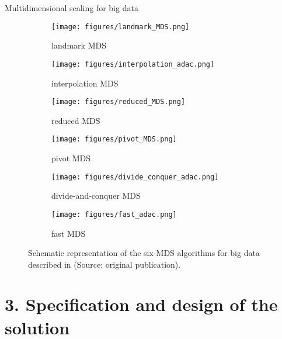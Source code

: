 \documentclass[10pt]{beamer}
\begin{document}
\begin{frame}{Multidimensional scaling for big data}
    \begin{figure}
    \centering
    \captionsetup[subfigure]{labelformat=empty}

    \begin{subfigure}[t]{0.3\textwidth}
        \centering
        \texttt{[image: figures/landmark\_MDS.png]}
        \caption{landmark MDS}
        \label{fig:landmark_MDS}
    \end{subfigure}
    \hfill
    \begin{subfigure}[t]{0.3\textwidth}
        \centering
        \texttt{[image: figures/interpolation\_adac.png]}
        \caption{interpolation MDS}
        \label{fig:interpolation_MDS}
    \end{subfigure}
    \hfill
    \begin{subfigure}[t]{0.3\textwidth}
        \centering
        \texttt{[image: figures/reduced\_MDS.png]}
        \caption{reduced MDS}
        \label{fig:reduced_MDS}
    \end{subfigure}

    \begin{subfigure}[t]{0.3\textwidth}
        \centering
        \texttt{[image: figures/pivot\_MDS.png]}
        \caption{pivot MDS}
        \label{fig:pivot_MDS}
    \end{subfigure}
    \hfill
    \begin{subfigure}[t]{0.3\textwidth}
        \centering
        \texttt{[image: figures/divide\_conquer\_adac.png]}
        \caption{\alert{divide-and-conquer MDS}}
        \label{fig:divide_conquer_MDS}
    \end{subfigure}
    \hfill
    \begin{subfigure}[t]{0.3\textwidth}
        \centering
        \texttt{[image: figures/fast\_adac.png]}
        \caption{fast MDS}
        \label{fig:fast_MDS}
    \end{subfigure}
    
    \caption{Schematic representation of the six MDS algorithms for big data described in \cite{Delicado2024} (Source: original publication).}
    \label{fig:bigmds}
\end{figure}
\end{frame}

\section{3. Specification and design of the solution}
\end{document}
